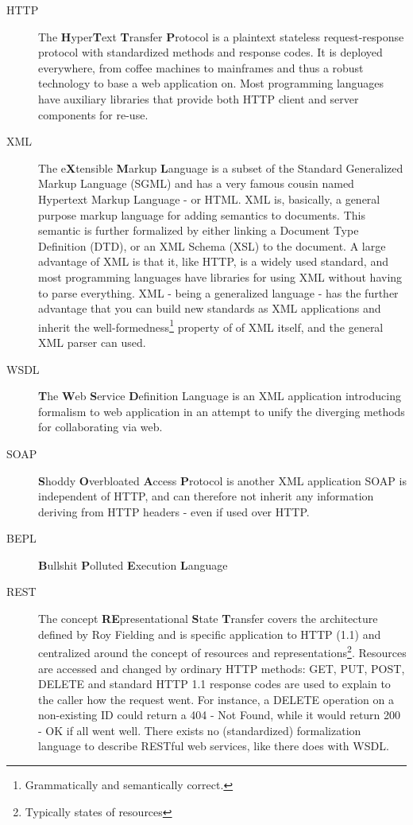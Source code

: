 \begin{description}
\item[HTTP] The \textbf{H}yper\textbf{T}ext \textbf{T}ransfer \textbf{P}rotocol is a plaintext stateless request-response protocol with standardized methods and response codes. It is deployed everywhere, from coffee machines to mainframes and thus a robust technology to base a web application on. Most programming languages have auxiliary libraries that provide both HTTP client and server components for re-use.

\item[XML] The e\textbf{X}tensible \textbf{M}arkup \textbf{L}anguage is a subset of the Standard Generalized Markup Language (SGML) and has a very famous cousin named Hypertext Markup Language - or HTML. XML is, basically, a general purpose markup language for adding semantics to documents. This semantic is further formalized by either linking a Document Type Definition (DTD), or an XML Schema (XSL) to the document. A large advantage of XML is that it, like HTTP, is a widely used standard, and most programming languages have libraries for using XML without having to parse everything. XML - being a generalized language - has the further advantage that you can build new standards as XML applications and inherit the well-formedness\footnote{Grammatically and semantically correct.} property of of XML itself, and the general XML parser can used.

\item[WSDL] \textbf{T}he \textbf{W}eb \textbf{S}ervice \textbf{D}efinition Language is an XML application introducing formalism to web application in an attempt to unify the diverging methods for collaborating via web.

\item[SOAP] \textbf{S}hoddy \textbf{O}verbloated \textbf{A}ccess \textbf{P}rotocol is another XML application %
SOAP is independent of HTTP, and can therefore not inherit any information deriving from HTTP headers - even if used over HTTP.

\item[BEPL] \textbf{B}ullshit \textbf{P}olluted \textbf{E}xecution \textbf{L}anguage %

\item[REST] The concept \textbf{RE}presentational \textbf{S}tate \textbf{T}ransfer covers the architecture defined by Roy Fielding and is specific application to HTTP (1.1) and centralized around the concept of resources and representations\footnote{Typically states of resources}. Resources are accessed and changed by ordinary HTTP methods: GET, PUT, POST, DELETE and standard HTTP 1.1 response codes are used to explain to the caller how the request went. For instance, a DELETE operation on a non-existing ID could return a 404 - Not Found, while it would return 200 - OK if all went well. There exists no (standardized) formalization language to describe RESTful web services, like there does with WSDL.


\end{description}
